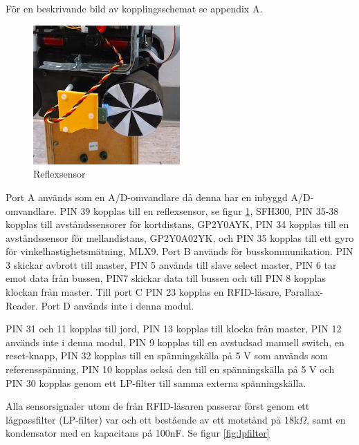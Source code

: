 \documentclass[a4paper,12pt,fleqn]{article}
\begin{document}
För en beskrivande bild av kopplingsschemat se appendix A.

\begin{figure}[htp] %
  \begin{center}
  \includegraphics[keepaspectratio=true,width=0.5\textwidth]{../Kappa/reflexsensor.png}  %
  \end{center}
  \caption{Reflexsensor} %
  \label{fig:reflex} %
\end{figure}

Port A används som en A/D-omvandlare då denna har en inbyggd A/D-omvandlare. PIN 39 kopplas till en reflexsensor, se figur \ref{fig:reflex}, SFH300, PIN 35-38 kopplas till avståndssensorer för kortdistans, GP\-2Y\-0A\-YK, 
PIN 34 kopplas till en avståndssensor för mellandistans, GP2Y0A02YK, och PIN 35 kopplas till ett gyro för vinkelhastighetsmätning, ML\-X9. Port B används för busskommunikation. PIN 3 skickar avbrott till master, PIN 5 används till slave select master, PIN 6 tar emot data från bussen, PIN7 skickar data till bussen och till PIN 8 kopplas klockan från master. Till port C PIN 23 kopplas en RFID-läsare, Parallax-Reader. Port D används inte i denna modul. 

PIN 31 och 11 kopplas till jord, PIN 13 kopplas till klocka från master, PIN 12 används inte i denna modul, PIN 9 kopplas till en avstudsad manuell switch, en reset-knapp, PIN 32 kopplas till en spänningskälla på 5 V som används som referensspänning, PIN 10 kopplas också den till en spänningskälla på 5 V och PIN 30 kopplas genom ett LP-filter till samma externa spänningskälla.

Alla sensorsignaler utom de från RFID-läsaren passerar först genom ett lågpassfilter (LP-filter) var och ett bestående av ett motstånd på 18k$\Omega$, samt en kondensator med en kapacitans på 100nF. Se figur \ref{fig:lpfilter}
\end{document}
